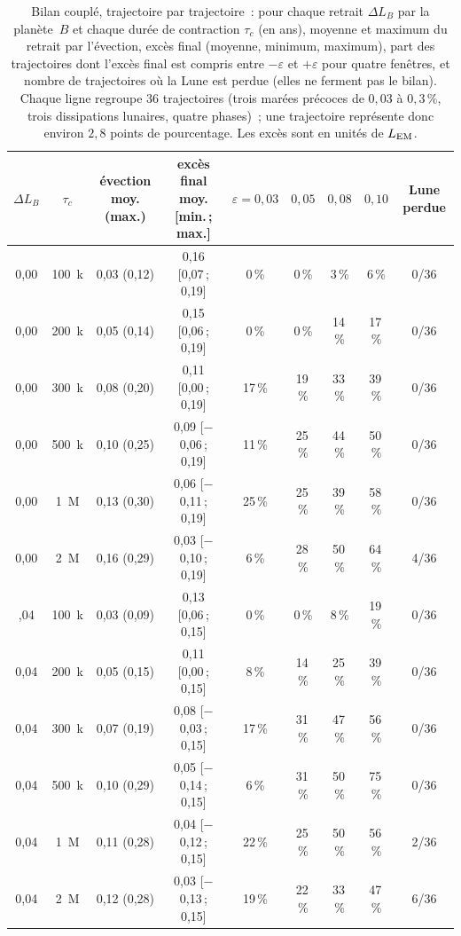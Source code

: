 \documentclass[11pt,a4paper]{article}
\newcommand{\LEM}{\ensuremath{L_{\rm EM}}}
\begin{document}
\begin{table}[htbp]\centering\footnotesize\setlength{\tabcolsep}{3.6pt}
\caption{Bilan couplé, trajectoire par trajectoire~: pour chaque retrait $\Delta L_B$ par la planète~$B$ et chaque durée de contraction $\tau_c$ (en ans), moyenne et maximum du retrait par l'évection, excès final (moyenne, minimum, maximum), part des trajectoires dont l'excès final est compris entre $-\varepsilon$ et $+\varepsilon$ pour quatre fenêtres, et nombre de trajectoires où la Lune est perdue (elles ne ferment pas le bilan). Chaque ligne regroupe $36$ trajectoires (trois marées précoces de $0{,}03$ à $0{,}3\,\%$, trois dissipations lunaires, quatre phases)~; une trajectoire représente donc environ $2{,}8$ points de pourcentage. Les excès sont en unités de $\LEM$.\label{tab:couple}}
\begin{tabular}{ccccccccc}\toprule
$\Delta L_B$ & $\tau_c$ & évection moy. (max.) & excès final moy. [min.\,; max.] & $\varepsilon{=}0{,}03$ & $0{,}05$ & $0{,}08$ & $0{,}10$ & Lune perdue \\
\midrule
0,00 & 100~k & 0,03 (0,12) & 0,16 [0,07\,; 0,19] & 0\,\% & 0\,\% & 3\,\% & 6\,\% & 0/36 \\
0,00 & 200~k & 0,05 (0,14) & 0,15 [0,06\,; 0,19] & 0\,\% & 0\,\% & 14\,\% & 17\,\% & 0/36 \\
0,00 & 300~k & 0,08 (0,20) & 0,11 [0,00\,; 0,19] & 17\,\% & 19\,\% & 33\,\% & 39\,\% & 0/36 \\
0,00 & 500~k & 0,10 (0,25) & 0,09 [$-$0,06\,; 0,19] & 11\,\% & 25\,\% & 44\,\% & 50\,\% & 0/36 \\
0,00 & 1~M & 0,13 (0,30) & 0,06 [$-$0,11\,; 0,19] & 25\,\% & 25\,\% & 39\,\% & 58\,\% & 0/36 \\
0,00 & 2~M & 0,16 (0,29) & 0,03 [$-$0,10\,; 0,19] & 6\,\% & 28\,\% & 50\,\% & 64\,\% & 4/36 \\
\addlinespace
0,04 & 100~k & 0,03 (0,09) & 0,13 [0,06\,; 0,15] & 0\,\% & 0\,\% & 8\,\% & 19\,\% & 0/36 \\
0,04 & 200~k & 0,05 (0,15) & 0,11 [0,00\,; 0,15] & 8\,\% & 14\,\% & 25\,\% & 39\,\% & 0/36 \\
0,04 & 300~k & 0,07 (0,19) & 0,08 [$-$0,03\,; 0,15] & 17\,\% & 31\,\% & 47\,\% & 56\,\% & 0/36 \\
0,04 & 500~k & 0,10 (0,29) & 0,05 [$-$0,14\,; 0,15] & 6\,\% & 31\,\% & 50\,\% & 75\,\% & 0/36 \\
0,04 & 1~M & 0,11 (0,28) & 0,04 [$-$0,12\,; 0,15] & 22\,\% & 25\,\% & 50\,\% & 56\,\% & 2/36 \\
0,04 & 2~M & 0,12 (0,28) & 0,03 [$-$0,13\,; 0,15] & 19\,\% & 22\,\% & 33\,\% & 47\,\% & 6/36 \\

\end{tabular}
\end{table}
\end{document}
